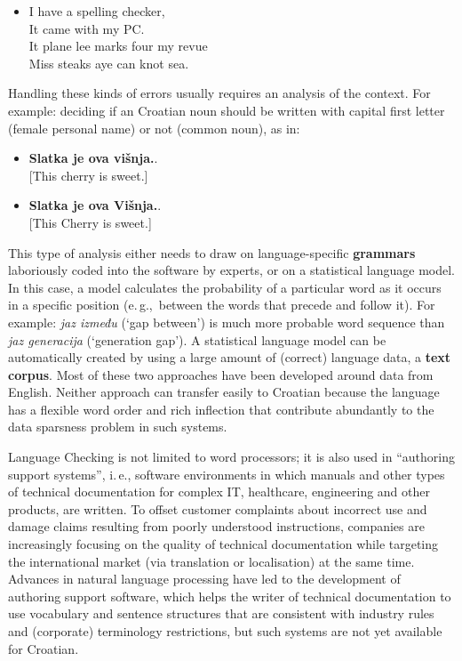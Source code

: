 \begin{multicols}{2}
\begin{itemize}
\item[] I have a spelling checker,\\
  It came with my PC.\\
  It plane lee marks four my revue\\
  Miss steaks aye can knot sea.
\end{itemize}

Handling these kinds of errors usually requires an analysis of the context. For example: deciding if an Croatian noun should be written with capital first letter (female personal name) or not (common noun), as in:

\begin{itemize}
\item \textbf{Slatka je ova višnja.}.\\
  {[}This cherry is sweet.{]} 
\item \textbf{Slatka je ova Višnja.}.\\
  {[}This Cherry is sweet.{]}
\end{itemize}

This type of analysis either needs to draw on language-specific \textbf{grammars} laboriously coded into the software by experts, or on a statistical language model. In this case, a model calculates the probability of a particular word as it occurs in a specific position (e.\,g.,~between the words that precede and follow it). For example: \emph{jaz između} (‘gap between’) is much more probable word sequence than \emph{jaz generacija} (‘generation gap’). A statistical language model can be automatically created by using a large amount of (correct) language data, a \textbf{text corpus}. Most of these two approaches have been developed around data from English. Neither approach can transfer easily to Croatian because the language has a flexible word order and rich inflection that contribute abundantly to the data sparsness problem in such systems.

Language Checking is not limited to word processors; it is also used in “authoring support systems”, i.\,e., software environments in which manuals and other types of technical documentation for complex IT, healthcare, engineering and other products, are written. To offset customer complaints about incorrect use and damage claims resulting from poorly understood instructions, companies are increasingly focusing on the quality of technical documentation while targeting the international market (via translation or localisation) at the same time. Advances in natural language processing have led to the development of authoring support software, which helps the writer of technical documentation to use vocabulary and sentence structures that are consistent with industry rules and (corporate) terminology restrictions, but such systems are not yet available for Croatian.


\end{multicols}
